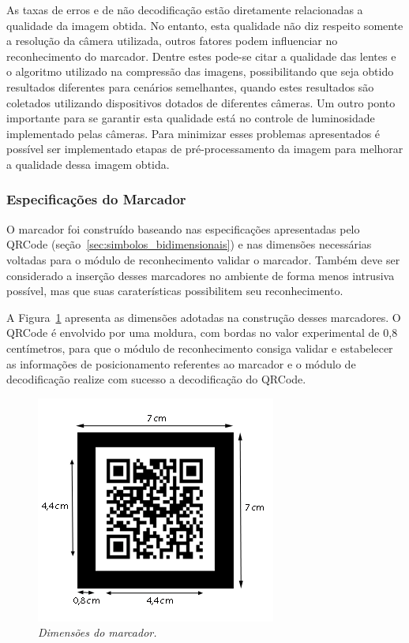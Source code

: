 	As taxas de erros e de não decodificação estão diretamente relacionadas a qualidade da imagem obtida. No entanto,
	esta qualidade não diz respeito somente a resolução da câmera utilizada, outros fatores podem influenciar no
	reconhecimento do marcador. Dentre estes pode-se citar a qualidade das lentes e o algoritmo utilizado na compressão 
	das imagens, possibilitando que seja obtido resultados diferentes para cenários semelhantes, quando estes 
	resultados são coletados utilizando dispositivos dotados de diferentes câmeras. Um outro ponto importante 
	para se garantir esta qualidade está no controle de luminosidade implementado pelas câmeras. Para minimizar esses 
	problemas apresentados é possível ser implementado etapas de pré-processamento da imagem para melhorar a qualidade
	dessa imagem obtida.
	
\subsubsection{Especificações do Marcador}

	O marcador foi construído baseando nas especificações apresentadas pelo QRCode
	(seção~\ref{sec:simbolos_bidimensionais}) e nas dimensões necessárias voltadas para o módulo de
	reconhecimento validar o marcador. Também deve ser considerado a inserção desses marcadores no ambiente de forma menos
	intrusiva possível, mas que suas caraterísticas possibilitem seu reconhecimento.
	
	A Figura~\ref{fig:dimensoes_marcador} apresenta as dimensões adotadas na construção desses
	marcadores. O QRCode é envolvido por uma moldura, com bordas no valor experimental de 0,8 centímetros, 
	para que o módulo de reconhecimento consiga validar e estabelecer as informações de
	posicionamento referentes ao marcador e o módulo de decodificação realize com sucesso a decodificação
	do QRCode.
	
	\begin{figure}[htb]
		\centering \includegraphics[scale=0.8]{figuras/cap4/dimensoes_marcador.png}
		\caption{\textit{Dimensões do marcador.}}
		\label{fig:dimensoes_marcador} 
	\end{figure}
	
